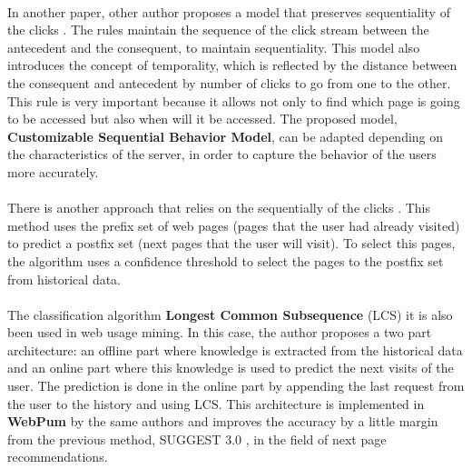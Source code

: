 \paragraph{}

In another paper, other author proposes a model that preserves sequentiality of
the clicks \cite{Frias-Martinez2003}. The rules maintain the sequence of the
click stream between the antecedent and the consequent, to maintain sequentiality.
This model also introduces the concept of temporality, which is reflected by the
distance between the consequent and antecedent by number of clicks to go from one
to the other. This rule is very important because it allows not only to find
which page is  going to be accessed but also when will it be accessed. The proposed
model, \textbf{Customizable Sequential Behavior Model}, can be adapted depending
on the characteristics of the server, in order to capture the behavior of the
users more accurately.

\paragraph{}

There is another approach that relies on the sequentially of the clicks
\cite{Jan:2007:WUB:1353862.1353874}.
This method uses the prefix set of web pages (pages that the user had already
visited) to predict a postfix set (next pages that the user will visit).
To select this pages, the algorithm uses a confidence threshold to select the pages
to the postfix set from historical data.


\paragraph{}

The classification algorithm \textbf{Longest Common Subsequence} (LCS)
\cite{4631852} it is also been used in web usage mining. In this case, the author
proposes a two part architecture: an offline part where knowledge is extracted
from the historical data and an online part where this knowledge is used to
predict the next visits of the user. The prediction is done in the online part by
appending the last request from the user to the history and using LCS. This
architecture is implemented in \textbf{WebPum} \cite{Jalali20106201} by the same
authors and improves the accuracy by a little margin from the
previous method, SUGGEST 3.0 \cite{1410804}, in the field of next page recommendations.

\paragraph{}

